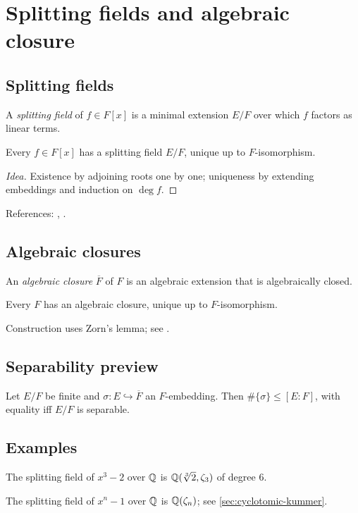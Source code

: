 \section{Splitting fields and algebraic closure}\label{sec:splitting-fields}

\subsection{Splitting fields}
\begin{definition}
A \emph{splitting field} of $f\in F[x]$ is a minimal extension $E/F$ over which $f$ factors as linear terms.
\end{definition}
\begin{theorem}
Every $f\in F[x]$ has a splitting field $E/F$, unique up to $F$-isomorphism.
\end{theorem}
\begin{proof}[Idea]
Existence by adjoining roots one by one; uniqueness by extending embeddings and induction on $\deg f$.
\end{proof}
References: \cite[\S14]{DF}, \cite[Ch.~V]{Artin}.

\subsection{Algebraic closures}
\begin{definition}
An \emph{algebraic closure} $\overline{F}$ of $F$ is an algebraic extension that is algebraically closed.
\end{definition}
\begin{theorem}
Every $F$ has an algebraic closure, unique up to $F$-isomorphism.
\end{theorem}
\begin{remark}
Construction uses Zorn's lemma; see \cite[Ch.~VIII]{Lang}.
\end{remark}

\subsection{Separability preview}
\begin{proposition}
Let $E/F$ be finite and $\sigma:E\hookrightarrow \overline{F}$ an $F$-embedding. Then $\#\{\sigma\}\le [E\!:\!F]$, with equality iff $E/F$ is separable.
\end{proposition}

\subsection{Examples}
\begin{example}
The splitting field of $x^3-2$ over $\mathbb{Q}$ is $\Q(\root3\of2,\zeta_3)$ of degree $6$.
\end{example}
\begin{example}
The splitting field of $x^n-1$ over $\mathbb{Q}$ is $\mathbb{Q}(\zeta_n)$; see \cref{sec:cyclotomic-kummer}.
\end{example}
